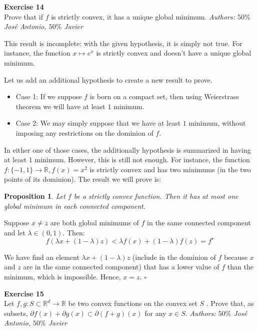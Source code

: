 \documentclass[11pt,table]{article}
\newcommand{\qed}{\hfill $\square$}
\newenvironment{problem}[2][Exercise]
{ \begin{mdframed}[backgroundcolor=gray!20] \textbf{#1 #2} \\}
	{\hspace{0.0cm}\newline\newline \emph{Authors: \(50\%\) José Antonio, \(50\%\) Javier}  \end{mdframed}}
\newtheorem{nprop}{Proposition}
\newcommand\R{\mathbb R}
\begin{document}
	\begin{problem}{14}
		Prove that if \( f \)  is strictly convex, it has a unique global minimum.
	\end{problem}
	
	This result is incomplete: with the given hypothesis, it is simply not true. For instance, the function $x \mapsto e^x$ is strictly convex and doesn't have a unique global minimum.
	
	Let us add an additional hypothesis to create a new result to prove.
	
	\begin{itemize}
		\item Case 1: If we suppose $f$ is born on a compact set, then using Weierstrass theorem we will have at least $1$ minimum.
		\item Case 2: We may simply suppose that we have at least $1$ minimum, without imposing any restrictions on the dominion of $f$.
	\end{itemize}
	
	In either one of those cases, the additionally hypothesis is summarized in having at least $1$ minimum. However, this is still not enough. For instance, the function $f:\{-1,1\} \rightarrow \R, f(x) = x^2$ is strictly convex and has two minimums (in the two points of its dominion). The result we will prove is:
	
	\begin{nprop}
		Let \( f \) be a strictly convex function. Then  it has at most one global minimum in each connected component.
	\end{nprop}
	
	Suppose $x \neq z$ are both global minimums of $f$ in the same connected component and let $\lambda \in (0,1)$. Then:
	\[
	f(\lambda x + (1-\lambda)z) < \lambda f(x) + (1-\lambda) f(z) = f^\star
	\]
	
	We have find an element $\lambda x + (1-\lambda)z$ (include in the dominion of $f$ because $x$ and $z$ are in the same connected component) that has a lower value of $f$ than the minimum, which is impossible. Hence, $x = z$. \qed \\
	
	\begin{problem}{15}
		Let \( f,g: S \subset \mathbb{R}^d \to \mathbb{R} \)  be two convex functions on the convex set \( S \) . Prove that, as subsets, \(  \partial f(x) + \partial g(x) \subset \partial(f+g)(x) \) for any $x\in S$.
	\end{problem}
	
\end{document}
